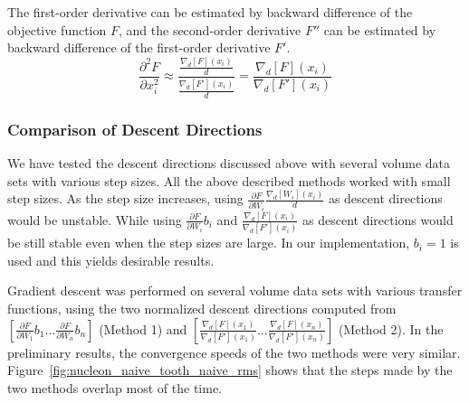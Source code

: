 The first-order derivative can be estimated by backward difference of the objective function $ F $, and the second-order derivative $ F'' $ can be estimated by backward difference of the first-order derivative $ F' $.
\[ \frac{\partial^2 F}{\partial x_{i}^2} 
\approx \dfrac{ \frac{\nabla_{d}[F](x_{i})}{d} }{ \frac{\nabla_{d}[F'](x_{i})}{d} }
= \frac{ \nabla_{d}[F](x_{i}) }{ \nabla_{d}[F'](x_{i}) } \]

\subsubsection{Comparison of Descent Directions}
We have tested the descent directions discussed above with several volume data sets with various step sizes.
All the above described methods worked with small step sizes. As the step size increases, using $ \frac{\partial F}{\partial W_{i}} \frac{\nabla_{d}[W_{i}](x_{i})}{d} $ as descent directions would be unstable. While using $ \frac{\partial F}{\partial W_{i}} b_{i} $ and $ \frac{ \nabla_{d}[F](x_{i}) }{ \nabla_{d}[F'](x_{i}) } $ as descent directions would be still stable even when the step sizes are large. In our implementation, $ b_{i}=1 $ is used and this yields desirable results.

Gradient descent was performed on several volume data sets with various transfer functions, using the two normalized descent directions computed from $ [ \frac{\partial F}{\partial W_{1}} b_{1} ... \frac{\partial F}{\partial W_{n}} b_{n} ] $ (Method 1)
 and 
$ [ \frac{ \nabla_{d}[F](x_{1}) }{ \nabla_{d}[F'](x_{1}) }  ... \frac{ \nabla_{d}[F](x_{n}) }{ \nabla_{d}[F'](x_{n}) } ] $ (Method 2).
In the preliminary results, the convergence speeds of the two methods were very similar. %
Figure~\ref{fig:nucleon_naive_tooth_naive_rms} shows that the steps made by the two methods overlap most of the time.

